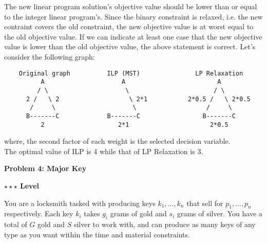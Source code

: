 \documentclass{article}\usepackage[utf8]{inputenc}\usepackage[margin=0.4cm,top=0.4cm,bottom=0.4cm]{geometry}\usepackage[usenames,dvipsnames,svgnames,table]{xcolor}
\begin{document}
\begin{enumerate}[(a)]
The new linear program solution's objective value should be lower than or equal to the integer linear program's. Since the binary constraint is relaxed, i.e. the new contraint covers the old constraint, the new objective value is at worst equal to the old objective value. If we can indicate at least one case that the new objective value is lower than the old objective value, the above statement is correct. Let's consider the following graph:
%
\begin{lstlisting}
	Original graph          ILP (MST)               LP Relaxation
	      A                     A                         A
	     / \                     \                       / \
	  2 /   \ 2                   \ 2*1           2*0.5 /   \ 2*0.5
	   /     \                     \                   /     \
	  B-------C             B-------C                 B-------C
	      2                    2*1                      2*0.5
\end{lstlisting}
%
where, the second factor of each weight is the selected decision variable.\\
The optimal value of ILP is 4 while that of LP Relaxation is 3.
\EndSolution
\end{enumerate}
\clearpage

\vspace{-2mm}\noindent\begin{mybox}{\begin{center}\textbf{\color{black}Problem 4: Major Key}\end{center}}\end{mybox}\vspace{-2mm}
\begin{myboxot}\noindent\textbf{$\star\star\star$ Level}\end{myboxot} 

\noindent You are a locksmith tasked with producing keys $k_1,\ldots ,k_n$ that sell for $p_1,\ldots ,p_n$ respectively. Each key $k_i$ takes $g_i$ grams of gold and $s_i$ grams of silver. You have a total of $G$ gold and $S$ silver to work with, and can produce as many keys of any type as you want within the time and material constraints.
\end{document}
